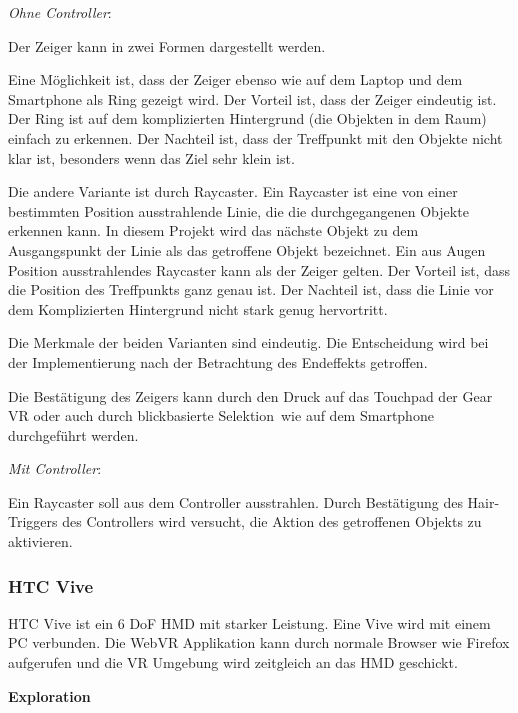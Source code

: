   \noindent
  \textsl{Ohne Controller}:
  \vspace{0.5em}
  
  \noindent
  Der Zeiger kann in zwei Formen dargestellt werden.
  
  Eine Möglichkeit ist, dass der Zeiger ebenso wie auf dem Laptop und dem Smartphone als Ring gezeigt wird. Der Vorteil ist, dass der Zeiger eindeutig ist. Der Ring ist auf dem komplizierten Hintergrund (die Objekten in dem Raum) einfach zu erkennen. Der Nachteil ist, dass der Treffpunkt mit den Objekte nicht klar ist, besonders wenn das Ziel sehr klein ist.
  
  Die andere Variante ist durch Raycaster. Ein Raycaster ist eine von einer bestimmten Position ausstrahlende Linie, die die durchgegangenen Objekte erkennen kann. In diesem Projekt wird das nächste Objekt zu dem Ausgangspunkt der Linie als das getroffene Objekt bezeichnet. Ein aus Augen Position ausstrahlendes Raycaster kann als der Zeiger gelten. Der Vorteil ist, dass die Position des Treffpunkts ganz genau ist. Der Nachteil ist, dass die Linie vor dem Komplizierten Hintergrund nicht stark genug hervortritt.
  
  Die Merkmale der beiden Varianten sind eindeutig. Die Entscheidung wird bei der Implementierung nach der Betrachtung des Endeffekts getroffen.
  
  Die Bestätigung des Zeigers kann durch den Druck auf das Touchpad der Gear VR oder auch durch \glqq blickbasierte Selektion\grqq\ wie auf dem Smartphone durchgeführt werden.
  
  \vspace{0.5em}
  \noindent
  \textsl{Mit Controller}:
  \vspace{0.5em}
  
  \noindent
  Ein Raycaster soll aus dem Controller ausstrahlen. Durch Bestätigung des Hair-Triggers des Controllers wird versucht, die Aktion des getroffenen Objekts zu aktivieren.
  
 \subsubsection{HTC Vive}
 HTC Vive ist ein 6 DoF HMD mit starker Leistung. Eine Vive wird mit einem PC verbunden. Die WebVR Applikation kann durch normale Browser wie Firefox aufgerufen und die VR Umgebung wird zeitgleich an das HMD geschickt.
 
  \vspace{1em}
  \noindent
  \textbf{Exploration}
  \vspace{1em}
  
